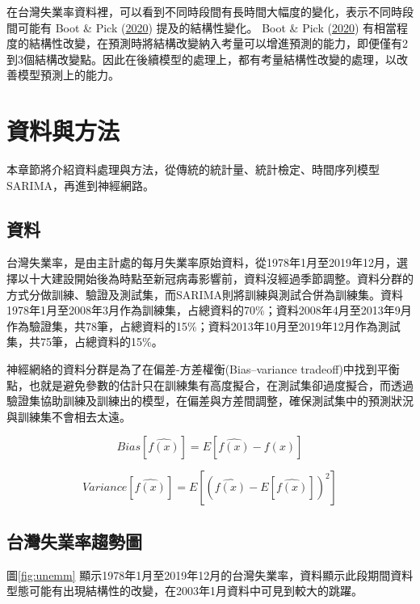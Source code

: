 \documentclass[oneside]{book}
\begin{document}
在台灣失業率資料裡，可以看到不同時段間有長時間大幅度的變化，表示不同時段間可能有 Boot \& Pick (\protect\hyperlink{ref-bootDoesModelingStructural2020}{2020}) 提及的結構性變化。 Boot \& Pick (\protect\hyperlink{ref-bootDoesModelingStructural2020}{2020}) 有相當程度的結構性改變，在預測時將結構改變納入考量可以增進預測的能力，即便僅有2到3個結構改變點。因此在後續模型的處理上，都有考量結構性改變的處理，以改善模型預測上的能力。

\hypertarget{ux8cc7ux6599ux8207ux65b9ux6cd5}{%
\chapter{資料與方法}\label{ux8cc7ux6599ux8207ux65b9ux6cd5}}

本章節將介紹資料處理與方法，從傳統的統計量、統計檢定、時間序列模型SARIMA，再進到神經網路。

\hypertarget{ux8cc7ux6599}{%
\section{資料}\label{ux8cc7ux6599}}

台灣失業率，是由主計處的每月失業率原始資料，從1978年1月至2019年12月，選擇以十大建設開始後為時點至新冠病毒影響前，資料沒經過季節調整。資料分群的方式分做訓練、驗證及測試集，而SARIMA則將訓練與測試合併為訓練集。資料1978年1月至2008年3月作為訓練集，占總資料的70\%；資料2008年4月至2013年9月作為驗證集，共78筆，占總資料的15\%；資料2013年10月至2019年12月作為測試集，共75筆，占總資料的15\%。

神經網絡的資料分群是為了在偏差-方差權衡(Bias--variance tradeoff)中找到平衡點，也就是避免參數的估計只在訓練集有高度擬合，在測試集卻過度擬合，而透過驗證集協助訓練及訓練出的模型，在偏差與方差間調整，確保測試集中的預測狀況與訓練集不會相去太遠。

\[
Bias[\hat{f(x)}] = E[\hat{f(x)}-f(x)]
\]

\[
Variance[\hat{f(x)}] = E[(\hat{f(x)}-E[\hat{f(x)}])^2]
\]

\hypertarget{ux53f0ux7063ux5931ux696dux7387ux8da8ux52e2ux5716}{%
\section{台灣失業率趨勢圖}\label{ux53f0ux7063ux5931ux696dux7387ux8da8ux52e2ux5716}}

圖\ref{fig:unemm} 顯示1978年1月至2019年12月的台灣失業率，資料顯示此段期間資料型態可能有出現結構性的改變，在2003年1月資料中可見到較大的跳躍。
\end{document}
